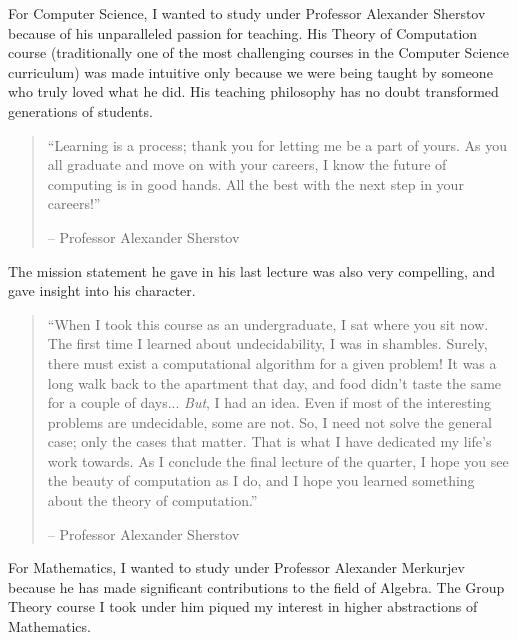 \documentclass[12pt]{article}
\newenvironment{example}{
\begin{tcolorbox}[title=Example, colback=blue!5!white, colframe=black!75!blue]
}{ \end{tcolorbox} }
\renewcommand{\it}[1]{\textit{{#1}}}
\begin{document}
\begin{example}
    For Computer Science, I wanted to study under Professor Alexander Sherstov
    because of his unparalleled passion for teaching. His Theory of Computation
    course (traditionally one of the most challenging courses in the Computer
    Science curriculum) was made intuitive only because we were being taught by
    someone who truly loved what he did. His teaching philosophy has no doubt
    transformed generations of students.

    \begin{quote}
        ``Learning is a process; thank you for letting me be a part of
        yours. As you all graduate and move on with your careers, I know the
        future of computing is in good hands. All the best with the next step in
        your careers!''
        \vspace{-1em}
        \begin{flushright}
            -- Professor Alexander Sherstov
        \end{flushright}
        \vspace{-1em}
    \end{quote}

    The mission statement he gave in his last lecture was also very compelling,
    and gave insight into his character.
    \begin{quote}
        ``When I took this course as an undergraduate, I sat where you sit now.
        The first time I learned about undecidability, I was in shambles.
        Surely, there must exist a computational algorithm for a given problem!
        It was a long walk back to the apartment that day, and food didn't taste
        the same for a couple of days... \it{But}, I had an idea. Even if most
        of the interesting problems are undecidable, some are not. So, I need
        not solve the general case; only the cases that matter. That is what I
        have dedicated my life's work towards. As I conclude the final lecture
        of the quarter, I hope you see the beauty of computation as I do, and I
        hope you learned something about the theory of computation.''
        \vspace{-1em}
        \begin{flushright}
            -- Professor Alexander Sherstov
        \end{flushright}
    \end{quote}
\end{example}

\begin{example}
    For Mathematics, I wanted to study under Professor Alexander Merkurjev
    because he has made significant contributions to the field of Algebra. The
    Group Theory course I took under him piqued my interest in higher
    abstractions of Mathematics.
\end{example}
\end{document}
